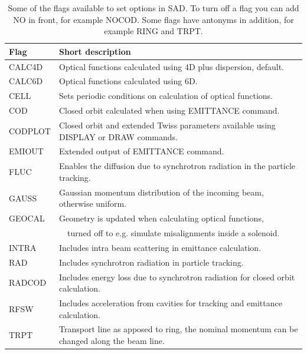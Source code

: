 \documentclass{article}
\begin{document}
\begin{table}[h]
	\begin{center}
	\caption{Some of the flags available to set options in SAD. To turn off a flag you can add NO in front, for example NOCOD. Some flags have antonyms in addition, for example RING and TRPT.}
	\label{tab:flags}
	\begin{tabular}[c]{ll}
	Flag			&	Short description		\\	\hline
	CALC4D		&	Optical functions calculated using 4D plus dispersion, default.	\\
	CALC6D		&	Optical functions calculated using 6D.					\\
	CELL		&	Sets periodic conditions on calculation of optical functions.	\\
	COD			&	Closed orbit calculated when using EMITTANCE command.	\\
	CODPLOT	&	Closed orbit and extended Twiss parameters available using DISPLAY or DRAW commands.	\\
	EMIOUT		&	Extended output of EMITTANCE command.				\\
	FLUC		&	Enables the diffusion due to synchrotron radiation in the particle tracking.					\\
	GAUSS		&	Gaussian momentum distribution of the incoming beam, otherwise uniform.				\\
	GEOCAL		&	Geometry is updated when calculating optical functions, \\& \ \ turned off to e.g. simulate misalignments inside a solenoid.	\\
	INTRA		&	Includes intra beam scattering in emittance calculation.		\\
	RAD			&	Includes synchrotron radiation in particle tracking.			\\
	RADCOD		&	Includes energy loss due to synchrotron radiation for closed orbit calculation.				\\
	RFSW		&	Includes acceleration from cavities for tracking and emittance calculation.					\\
	TRPT		&	Transport line as apposed to ring, the nominal momentum can be changed along the beam line.\\
	\end{tabular}
	\end{center}
\end{table}
\end{document}
